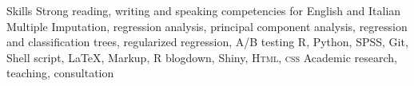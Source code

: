 
\begin{rubric}{Skills}
\entry*[Languages]
	Strong reading, writing and speaking competencies for English and Italian
	Multiple Imputation, regression analysis, principal component analysis, regression and classification trees, regularized regression, A/B testing
	R, Python, SPSS, Git, Shell script, \LaTeX, Markup,
	R blogdown, Shiny, \textsc{Html, css}
\entry*[Misc.]
	Academic research, teaching, consultation
\end{rubric}
